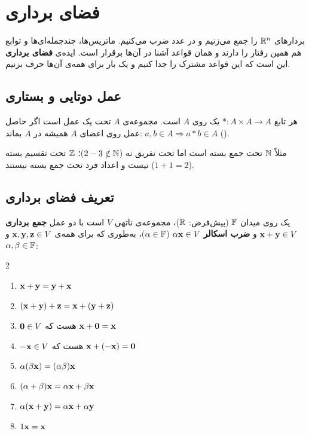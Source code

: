 \chapter{فضای برداری}
\label{ch:vector-spaces}

بردارهای $\mathbb{R}^n$ را جمع می‌زنیم و در عدد ضرب می‌کنیم. ماتریس‌ها، چندجمله‌ای‌ها و توابع هم همین رفتار را دارند و همان قواعد آشنا در آن‌ها برقرار است. ایده‌ی \textbf{فضای برداری} این است که این قواعد مشترک را جدا کنیم و یک بار برای همه‌ی آن‌ها حرف بزنیم.

\section{عمل دوتایی و بستاری}

\begin{definition}
هر تابع $*:A\times A\to A$ یک  روی $A$ است. مجموعه‌ی $A$ تحت یک عمل  است اگر حاصل عمل روی اعضای $A$ همیشه در $A$ بماند: $a,b\in A\Rightarrow a*b\in A$ ().
\end{definition}

مثلاً $\mathbb{N}$ تحت جمع بسته است اما تحت تفریق نه ($2-3\notin\mathbb{N}$)؛ $\mathbb{Z}$ تحت تقسیم بسته نیست و اعداد فرد تحت جمع بسته نیستند ($1+1=2$).

\section{تعریف فضای برداری}

\begin{definition}
یک  روی میدان  $\mathbb{F}$ (پیش‌فرض: $\mathbb{R}$)، مجموعه‌ی ناتهی $V$ است با دو عمل
\textbf{جمع برداری} $\mathbf{x}+\mathbf{y}\in V$ و \textbf{ضرب اسکالر} $\alpha\mathbf{x}\in V$ ($\alpha\in\mathbb{F}$)،
به‌طوری که برای همه‌ی $\mathbf{x},\mathbf{y},\mathbf{z}\in V$ و $\alpha,\beta\in\mathbb{F}$:
\begin{multicols}{2}
\begin{enumerate}
  \item $\mathbf{x}+\mathbf{y}=\mathbf{y}+\mathbf{x}$
  \item $(\mathbf{x}+\mathbf{y})+\mathbf{z}=\mathbf{x}+(\mathbf{y}+\mathbf{z})$
  \item $\mathbf{0}\in V$ هست که $\mathbf{x}+\mathbf{0}=\mathbf{x}$
  \item $-\mathbf{x}\in V$ هست که $\mathbf{x}+(-\mathbf{x})=\mathbf{0}$
  \item $\alpha(\beta\mathbf{x})=(\alpha\beta)\mathbf{x}$
  \item $(\alpha+\beta)\mathbf{x}=\alpha\mathbf{x}+\beta\mathbf{x}$
  \item $\alpha(\mathbf{x}+\mathbf{y})=\alpha\mathbf{x}+\alpha\mathbf{y}$
  \item $1\mathbf{x}=\mathbf{x}$
\end{enumerate}
\end{multicols}
\end{definition}


